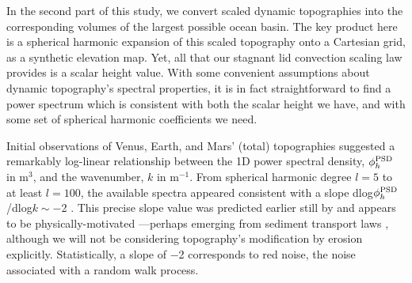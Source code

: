 In the second part of this study, we convert scaled dynamic topographies into the corresponding volumes of the largest possible ocean basin. The key product here is a spherical harmonic expansion of this scaled topography onto a Cartesian grid, as a synthetic elevation map. Yet, all that our stagnant lid convection scaling law provides is a scalar height value. With some convenient assumptions about dynamic topography's spectral properties, it is in fact straightforward to find a power spectrum which is consistent with both the scalar height we have, and with some set of spherical harmonic coefficients we need.

Initial observations of Venus, Earth, and Mars' (total) topographies suggested a remarkably log-linear relationship between the 1D power spectral density, $\phi^{\rm PSD}_h$ in m$^3$, and the wavenumber, $k$ in m$^{-1}$. From spherical harmonic degree $l=5$ to at least $l=100$, the available spectra appeared consistent with a slope dlog$\phi^{\rm PSD}_h$/dlog$k \sim-$2 \citep{turcotte_fractal_1987, rapp_decay_1989, balmino_spectra_1993}. This precise slope value was predicted earlier still by \citet{vening1951remarkable} and appears to be physically-motivated \citep{sayles_surface_1978, lovejoy_l1_1995}---perhaps emerging from sediment transport laws \citep{pelletier_why_1997, pelletier_selforganization_1999, roberts_generation_2019}, although we will not be considering topography's modification by erosion explicitly. Statistically, a slope of $-$2 corresponds to red noise, the noise associated with a random walk process. 




